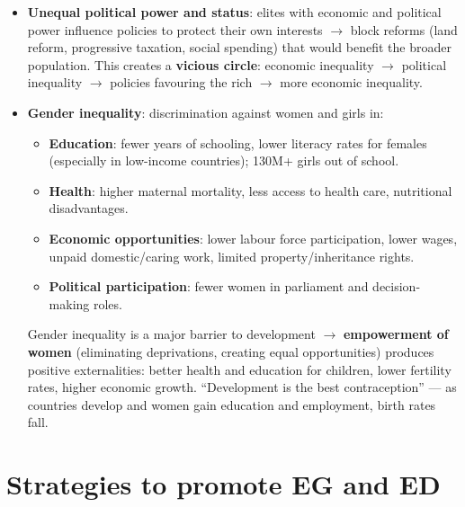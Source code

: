 \documentclass[a4paper,12pt]{article}
\begin{document}
\begin{itemize}
  \item \textbf{Unequal political power and status}: elites with economic and political power influence policies to protect their own interests $\to$ block reforms (land reform, progressive taxation, social spending) that would benefit the broader population. This creates a \textbf{vicious circle}: economic inequality $\to$ political inequality $\to$ policies favouring the rich $\to$ more economic inequality.
  \item \textbf{Gender inequality}: discrimination against women and girls in:
  \begin{itemize}
    \item \textbf{Education}: fewer years of schooling, lower literacy rates for females (especially in low-income countries); 130M+ girls out of school.
    \item \textbf{Health}: higher maternal mortality, less access to health care, nutritional disadvantages.
    \item \textbf{Economic opportunities}: lower labour force participation, lower wages, unpaid domestic/caring work, limited property/inheritance rights.
    \item \textbf{Political participation}: fewer women in parliament and decision-making roles.
  \end{itemize}
  Gender inequality is a major barrier to development $\to$ \textbf{empowerment of women} (eliminating deprivations, creating equal opportunities) produces positive externalities: better health and education for children, lower fertility rates, higher economic growth. ``Development is the best contraception'' --- as countries develop and women gain education and employment, birth rates fall.
\end{itemize}
\section{Strategies to promote EG and ED}\label{sec:strategies}
\end{document}
